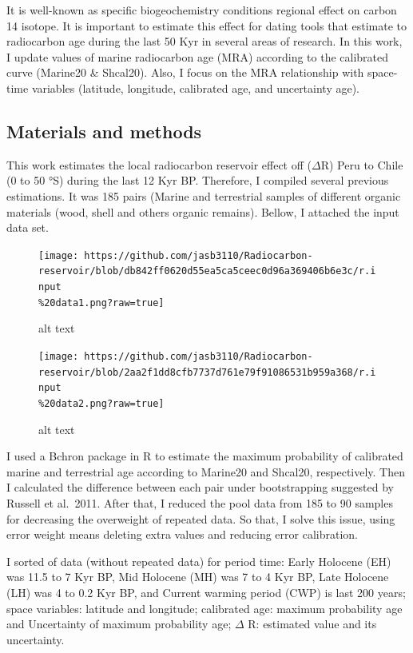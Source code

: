 \documentclass[
]{article}
\begin{document}
It is well-known as specific biogeochemistry conditions regional effect
on carbon 14 isotope. It is important to estimate this effect for dating
tools that estimate to radiocarbon age during the last 50 Kyr in several
areas of research. In this work, I update values of marine radiocarbon
age (MRA) according to the calibrated curve (Marine20 \& Shcal20). Also,
I focus on the MRA relationship with space-time variables (latitude,
longitude, calibrated age, and uncertainty age).

\hypertarget{materials-and-methods}{%
\subsection{Materials and methods}\label{materials-and-methods}}

This work estimates the local radiocarbon reservoir effect off
(\(\Delta\)R) Peru to Chile (0 to 50 °S) during the last 12 Kyr BP.
Therefore, I compiled several previous estimations. It was 185 pairs
(Marine and terrestrial samples of different organic materials (wood,
shell and others organic remains). Bellow, I attached the input data
set.

\begin{figure}
\centering
\texttt{[image: https://github.com/jasb3110/Radiocarbon-reservoir/blob/db842ff0620d55ea5ca5ceec0d96a369406b6e3c/r.input\\\%20data1.png?raw=true]}
\caption{alt text}
\end{figure}

\begin{figure}
\centering
\texttt{[image: https://github.com/jasb3110/Radiocarbon-reservoir/blob/2aa2f1dd8cfb7737d761e79f91086531b959a368/r.input\\\%20data2.png?raw=true]}
\caption{alt text}
\end{figure}

I used a Bchron package in R to estimate the maximum probability of
calibrated marine and terrestrial age according to Marine20 and Shcal20,
respectively. Then I calculated the difference between each pair under
bootstrapping suggested by Russell et al.~2011. After that, I reduced
the pool data from 185 to 90 samples for decreasing the overweight of
repeated data. So that, I solve this issue, using error weight means
deleting extra values and reducing error calibration.

I sorted of data (without repeated data) for period time: Early Holocene
(EH) was 11.5 to 7 Kyr BP, Mid Holocene (MH) was 7 to 4 Kyr BP, Late
Holocene (LH) was 4 to 0.2 Kyr BP, and Current warming period (CWP) is
last 200 years; space variables: latitude and longitude; calibrated age:
maximum probability age and Uncertainty of maximum probability age;
\(\Delta\) R: estimated value and its uncertainty.
\end{document}
